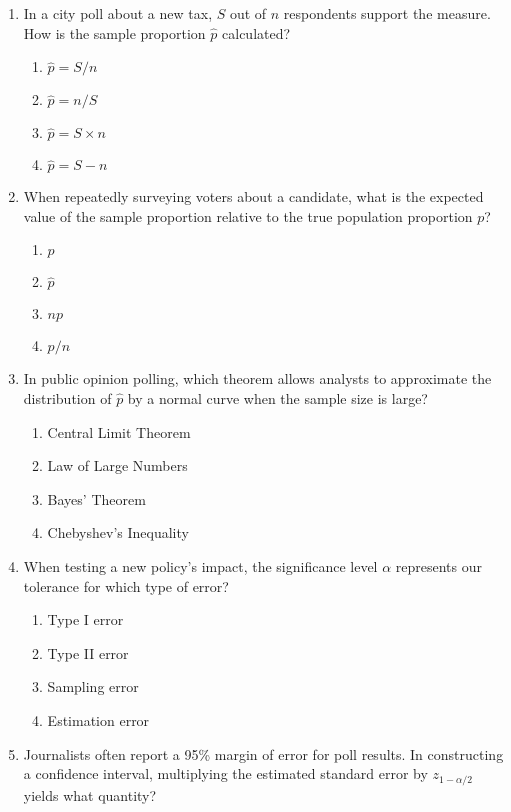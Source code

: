 \documentclass{article}
\begin{document}
\begin{enumerate}
\item In a city poll about a new tax, $S$ out of $n$ respondents support the measure. How is the sample proportion $\hat{p}$ calculated?
  \begin{enumerate}[label=(\Alph*)]
  \item $\hat{p}=S/n$
  \item $\hat{p}=n/S$
  \item $\hat{p}=S\times n$
  \item $\hat{p}=S-n$
  \end{enumerate}
\item When repeatedly surveying voters about a candidate, what is the expected value of the sample proportion relative to the true population proportion $p$?
  \begin{enumerate}[label=(\Alph*)]
  \item $p$
  \item $\hat{p}$
  \item $np$
  \item $p/n$
  \end{enumerate}
\item In public opinion polling, which theorem allows analysts to approximate the distribution of $\hat{p}$ by a normal curve when the sample size is large?
  \begin{enumerate}[label=(\Alph*)]
  \item Central Limit Theorem
  \item Law of Large Numbers
  \item Bayes' Theorem
  \item Chebyshev's Inequality
  \end{enumerate}
\item When testing a new policy's impact, the significance level $\alpha$ represents our tolerance for which type of error?
  \begin{enumerate}[label=(\Alph*)]
  \item Type I error
  \item Type II error
  \item Sampling error
  \item Estimation error
  \end{enumerate}
\item Journalists often report a 95\% margin of error for poll results. In constructing a confidence interval, multiplying the estimated standard error by $z_{1-\alpha/2}$ yields what quantity?
  \begin{enumerate}[label=(\Alph*)]

\end{enumerate}
\end{enumerate}
\end{document}
